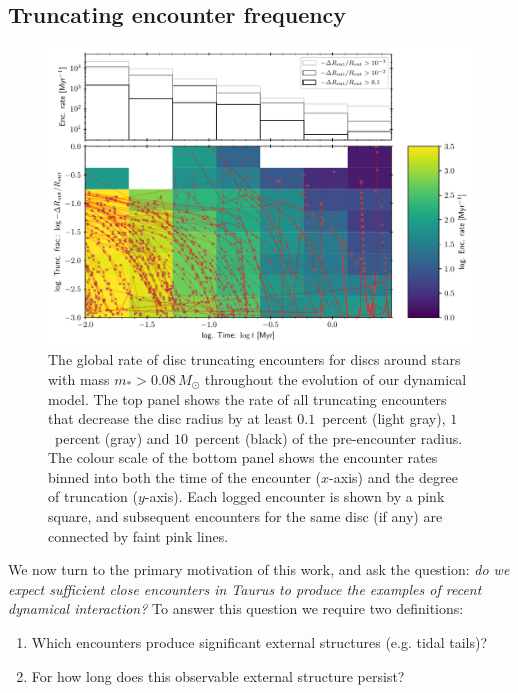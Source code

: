 \documentclass{aa}
\begin{document}
\subsection{Truncating encounter frequency}

\label{sec:encounter_freq}
\begin{figure}
    \centering
    \includegraphics[width=\textwidth]{Figures/encounter_summary_mRrel.pdf}
    \caption{The global rate of disc truncating encounters for discs around stars with mass $m_*>0.08\, M_\odot$ throughout the evolution of our dynamical model. The top panel shows the rate of all truncating encounters that decrease the disc radius by at least $0.1$~percent (light gray), $1$~percent (gray) and $10$~percent (black) of the pre-encounter radius. The colour scale of the bottom panel shows the encounter rates binned into both the time of the encounter ($x$-axis) and the degree of truncation ($y$-axis). Each logged encounter is shown by a pink square, and subsequent encounters for the same disc (if any) are connected by faint pink lines. }
    \label{fig:encounter_summary}
\end{figure}

We now turn to the primary motivation of this work, and ask the question: \textit{do we expect sufficient close encounters in Taurus to produce the examples of recent dynamical interaction?} To answer this question we require two definitions:
\begin{enumerate}
    \item Which encounters produce significant external structures (e.g. tidal tails)? 
    \item For how long does this observable external structure persist? 
\end{enumerate}
\end{document}
